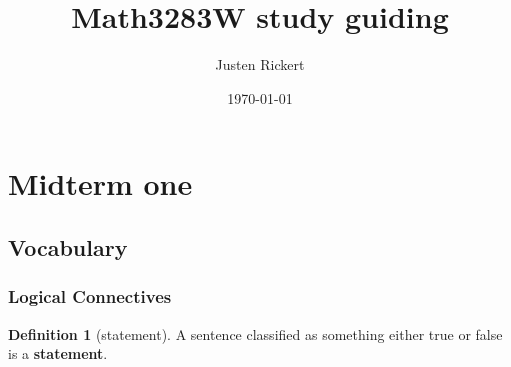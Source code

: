 \documentclass[12pt]{article}
\author{Justen Rickert}
\date{\today}
\title{Math3283W study guiding}
\begin{document}
\maketitle
\tableofcontents

\newcommand\bd[1]{\text{bd }#1}
\newcommand\cl[1]{\text{cl }#1}
\newcommand\interior[1]{\text{int }#1}
\newcommand\lim[1]{\text{lim }#1}
\newcommand\rng[1]{\text{rng }#1}
\newcommand\dom[1]{\text{dom }#1}
\newcommand\min[1]{\text{min }#1}
\newcommand\max[1]{\text{max }#1}

\newcommand{\def}[1]{\textit{\textbf{#1}}}
\newcommand\abs[1]{\left|#1\right|}
\newcommand\deg{\textdegree}
\newcommand\Real{\mathbb{R}}
\newcommand\Natural{\mathbb{N}}
\newcommand\Rational{\mathbb{Q}}

\newcommand\sube{\subseteq}
\newcommand\supe{\supseteq}
\newcommand\sub{\subset}
\newcommand\sup{\supset}

\newcommand\setm{\setminus}
\newcommand\pr{\ensuremath{'}}
\newcommand\R{\mathcal{R}}
\newcommand\calR{\mathcal{R}}
\newcommand\calP{\mathcal{P}}
\newcommand\pow{\mathscr{P}}
\newcommand\indX{\mathscr{X}}
\newcommand\F{\mathscr{F}}
\newcommand\G{\mathscr{G}}

\newcommand\empty{\varnothing}

\theoremstyle{definition}
\newtheorem{definition}{Definition}
\newtheorem{theorem}{Theorem}
\newtheorem*{corollary}{Corollary}
\newtheorem*{lemma}{Lemma}
\newtheorem*{remark}{Remark}
\newtheorem*{axiom}{Axiom}
\renewcommand\qedsymbol{$\blacksquare$}

\pagebreak

\section{Midterm one}
\label{sec:orge6489e7}
\subsection{Vocabulary}
\label{sec:org0197882}
\subsubsection{Logical Connectives}
\label{sec:org7579ac5}
\begin{definition}[statement]  
A sentence classified as something either true or false is a \textbf{statement}.
\end{definition}
\end{document}
